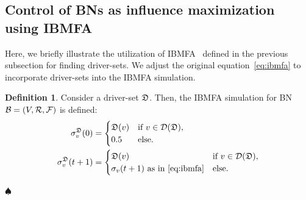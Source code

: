 \documentclass[
	digital, oneside, nosansbold, nocolorbold, nolot, nolof
]{fithesis4}
\theoremstyle{definition}
\newtheorem{definition}{Definition}
\theoremstyle{definition}
\newenvironment{ldefinition}
    {\begin{definition}}
	{\par\hspace{\stretch{1}}$\spadesuit$\hspace{\stretch{1}}
     \par\end{definition}}
\begin{document}
\subsection{Control of BNs as influence maximization using IBMFA}

Here, we briefly illustrate the utilization of IBMFA~\cite{infl_max_BN} defined
in the previous subsection for finding driver-sets. We adjust the original
equation~\ref{eq:ibmfa} to incorporate driver-sets into the IBMFA simulation.
\begin{ldefinition}
Consider a driver-set $\mathfrak{D}$. Then, the IBMFA simulation for BN
$\mathcal{B} = (V, \mathcal{R}, \mathcal{F})$ is defined:
\begin{align*}
    \sigma_v^{\mathfrak{D}}(0) &=
    \begin{cases}
        \mathfrak{D}(v) & \text{if } v \in \mathcal{D}(\mathfrak{D}),\\
        0.5 & \text{else}.
    \end{cases} \\
    \sigma_v^{\mathfrak{D}}(t + 1) &=
    \begin{cases}
        \mathfrak{D}(v) & \text{if } v \in \mathcal{D}(\mathfrak{D}),\\
        \sigma_v(t + 1) \text{ as in~\ref{eq:ibmfa}} & \text{else}.
    \end{cases}
\end{align*}
\end{ldefinition}
\end{document}
